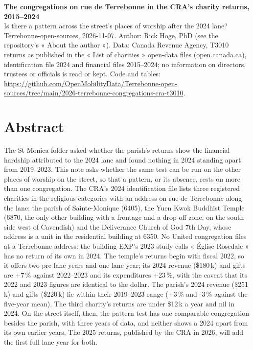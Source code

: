 \documentclass[11pt,a4paper]{article}
\begin{document}
{\LARGE\textbf{The congregations on rue de Terrebonne in the CRA\textquoteright{}s charity returns, 2015--2024}}\\[3pt]
{\large Is there a pattern across the street\textquoteright{}s places of worship after the 2024 lane?}\\[4pt]
{\small Terrebonne-open-sources, 2026-11-07. Author: Rick Hoge, PhD (see the repository\textquoteright{}s « About the author »). Data: Canada Revenue Agency, T3010 returns as published in the « List of charities » open-data files (open.canada.ca), identification file 2024 and financial files 2015--2024; no information on directors, trustees or officials is read or kept. Code and tables: \url{https://github.com/OpenMobilityData/Terrebonne-open-sources/tree/main/2026-terrebonne-congregations-cra-t3010}.}

\section*{Abstract}
The St Monica folder asked whether the parish\textquoteright{}s returns show the financial hardship attributed to the 2024 lane and found nothing in 2024 standing apart from 2019--2023. This note asks whether the same test can be run on the other places of worship on the street, so that a pattern, or its absence, rests on more than one congregation. The CRA\textquoteright{}s 2024 identification file lists three registered charities in the religious categories with an address on rue de Terrebonne along the lane: the parish of Sainte-Monique (6405), the Yuen Kwok Buddhist Temple (6870, the only other building with a frontage and a drop-off zone, on the south side west of Cavendish) and the Deliverance Church of God 7th Day, whose address is a unit in the residential building at 6350. No United congregation files at a Terrebonne address: the building EXP\textquoteright{}s 2023 study calls « Église Rosedale » has no return of its own in 2024. The temple\textquoteright{}s returns begin with fiscal 2022, so it offers two pre-lane years and one lane year; its 2024 revenue (\$180\,k) and gifts are +7\,\% against 2022--2023 and its expenditures +23\,\%, with the caveat that its 2022 and 2023 figures are identical to the dollar. The parish\textquoteright{}s 2024 revenue (\$251\,k) and gifts (\$220\,k) lie within their 2019--2023 range (+3\,\% and -3\,\% against the five-year mean). The third charity\textquoteright{}s returns are under \$12\,k a year and nil in 2024. On the street itself, then, the pattern test has one comparable congregation besides the parish, with three years of data, and neither shows a 2024 apart from its own earlier years. The 2025 returns, published by the CRA in 2026, will add the first full lane year for both.
\end{document}
